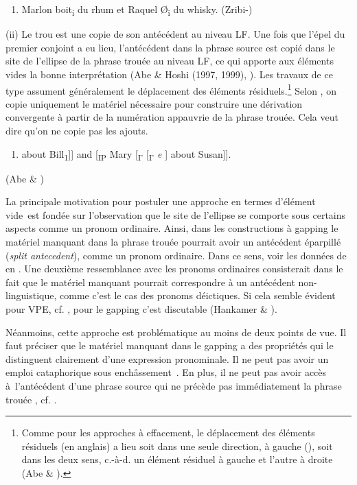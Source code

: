 \begin{enumerate}
\item Marlon boit\textsubscript{i} du rhum et Raquel {\O}\textsubscript{i} du whisky.      (Zribi-\citet[398]{Hertz1986}) 


\end{enumerate}
(ii) Le trou est une copie de son antécédent au niveau LF. Une fois que l'épel du premier conjoint a eu lieu, l'antécédent dans la phrase source est copié dans le site de l'ellipse de la phrase trouée au niveau LF, ce qui apporte aux éléments vides la bonne interprétation (Abe \& Hoshi (1997, 1999), \citet{Repp2009}). Les travaux de ce type assument généralement le déplacement des éléments résiduels.\footnote{Comme pour les approches à effacement, le déplacement des éléments résiduels (en anglais) a lieu soit dans une seule direction, à gauche (\citet{Repp2009}), soit dans les deux sens, c.-à-d. un élément résiduel à gauche et l'autre à droite (Abe \& \citet{Hoshi1999}).} Selon \citet{Repp2009}, on copie uniquement le matériel nécessaire pour construire une dérivation convergente à partir de la numération appauvrie de la phrase trouée. Cela veut dire qu'on ne copie pas les ajouts.


\begin{enumerate}
\item [\textsubscript{IP} John [\textsubscript{I'} [\textsubscript{I'} talked \textit{t}\textsubscript{1}] about Bill\textsubscript{1}]] and [\textsubscript{IP} Mary [\textsubscript{I'} [\textsubscript{I'} \textit{e} ] about Susan]].  


\end{enumerate}
{\raggedleft
(Abe \& \citet{Hoshi1999})
}

La principale motivation pour postuler une approche en termes d'élément vide~est fondée sur l'observation que le site de l'ellipse se comporte sous certains aspects comme un pronom ordinaire. Ainsi, dans les constructions à gapping le matériel manquant dans la phrase trouée pourrait avoir un antécédent éparpillé (\textit{split antecedent}), comme un pronom ordinaire. Dans ce sens, voir les données de \citet{Coppock2001} en . Une deuxième ressemblance avec les pronoms ordinaires consisterait dans le fait que le matériel manquant pourrait correspondre à un antécédent non-linguistique, comme c'est le cas des pronoms déictiques. Si cela semble évident pour VPE, cf. \citet{Lobeck1995}, pour le gapping c'est discutable (Hankamer \& \citet{Sag1976}).

Néanmoins, cette approche est problématique au moins de deux points de vue. Il faut préciser que le matériel manquant dans le gapping a des propriétés qui le distinguent clairement d'une expression pronominale. Il ne peut pas avoir un emploi cataphorique sous enchâssement~. En plus, il ne peut pas avoir accès à~l'antécédent d'une phrase source qui ne précède pas immédiatement la phrase trouée , cf. \citet{Kehler2002}.



